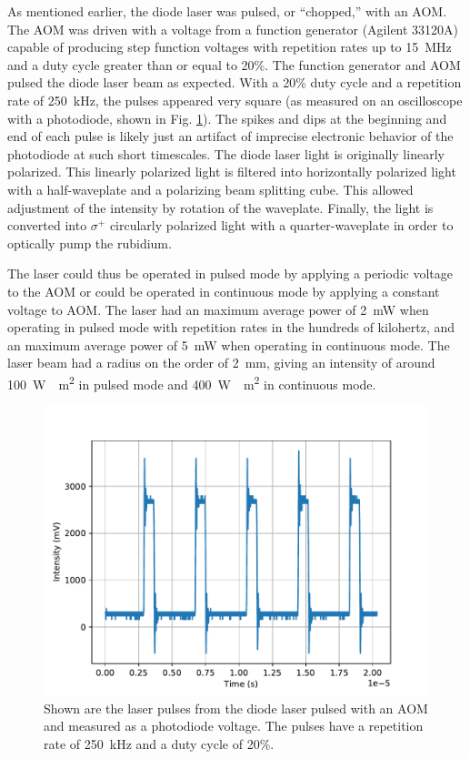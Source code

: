 As mentioned earlier, the diode laser was pulsed, or ``chopped,'' with an AOM. The AOM was driven with a voltage from a function generator (Agilent 33120A) capable of producing step function voltages with repetition rates up to \SI{15}{\mega \hertz} and a duty cycle greater than or equal to 20\%. The function generator and AOM pulsed the diode laser beam as expected. With a 20\% duty cycle and a repetition rate of \SI{250}{ kHz}, the pulses appeared very square (as measured on an oscilloscope with a photodiode, shown in Fig. \ref{fig:diodepulse1}). The spikes and dips at the beginning and end of each pulse is likely just an artifact of imprecise electronic behavior of the photodiode at such short timescales. The diode laser light is originally linearly polarized. This linearly polarized light is filtered into horizontally polarized light with a half-waveplate and a polarizing beam splitting cube. This allowed adjustment of the intensity by rotation of the waveplate. Finally, the light is converted into $\sigma ^+$ circularly polarized light with a quarter-waveplate in order to optically pump the rubidium.

The laser could thus be operated in pulsed mode by applying a periodic voltage to the AOM or could be operated in continuous mode by applying a constant voltage to AOM. The laser had an maximum average power of \SI{2}{\milli W} when operating in pulsed mode with repetition rates in the hundreds of kilohertz, and an maximum average power of \SI{5}{\milli W} when operating in continuous mode. The laser beam had a radius on the order of \SI{2}{\milli \meter}, giving an intensity of around \SI{100}{W \per \meter \squared} in pulsed mode and \SI{400}{W \per \meter \squared} in continuous mode.

\begin{figure}[ht!]
		\centering
		\includegraphics[width = .8\textwidth]{Images/diodepulse.pdf}
		\caption{Shown are the laser pulses from the diode laser pulsed with an AOM and measured as a photodiode voltage. The pulses have a repetition rate of \SI{250}{ kHz} and a duty cycle of 20\%.}
		\label{fig:diodepulse1}
\end{figure}

